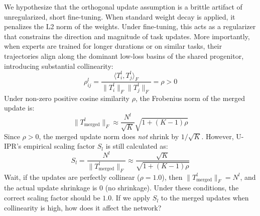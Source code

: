 \documentclass{article}
\theoremstyle{plain}
\theoremstyle{definition}
\theoremstyle{remark}
\begin{document}
We hypothesize that the orthogonal update assumption is a brittle artifact of unregularized, short fine-tuning. When standard weight decay is applied, it penalizes the L2 norm of the weights. Under fine-tuning, this acts as a regularizer that constrains the direction and magnitude of task updates. More importantly, when experts are trained for longer durations or on similar tasks, their trajectories align along the dominant low-loss basins of the shared progenitor, introducing substantial collinearity:
\begin{equation}
    \rho_{ij}^l = \frac{\langle T_i^l, T_j^l \rangle_F}{\|T_i^l\|_F \|T_j^l\|_F} = \rho > 0
\end{equation}
Under non-zero positive cosine similarity $\rho$, the Frobenius norm of the merged update is:
\begin{equation}
    \|T_{\text{merged}}^l\|_F \approx \frac{N^l}{\sqrt{K}}\sqrt{1 + (K-1)\rho}
\end{equation}
Since $\rho > 0$, the merged update norm does \textit{not} shrink by $1/\sqrt{K}$. However, U-IPR's empirical scaling factor $S_l$ is still calculated as:
\begin{equation}
    S_l = \frac{N^l}{\|T_{\text{merged}}^l\|_F} \approx \frac{\sqrt{K}}{\sqrt{1 + (K-1)\rho}}
\end{equation}
Wait, if the updates are perfectly collinear ($\rho = 1.0$), then $\|T_{\text{merged}}^l\|_F = N^l$, and the actual update shrinkage is $0$ (no shrinkage). Under these conditions, the correct scaling factor should be $1.0$. If we apply $S_l$ to the merged updates when collinearity is high, how does it affect the network?
\end{document}
